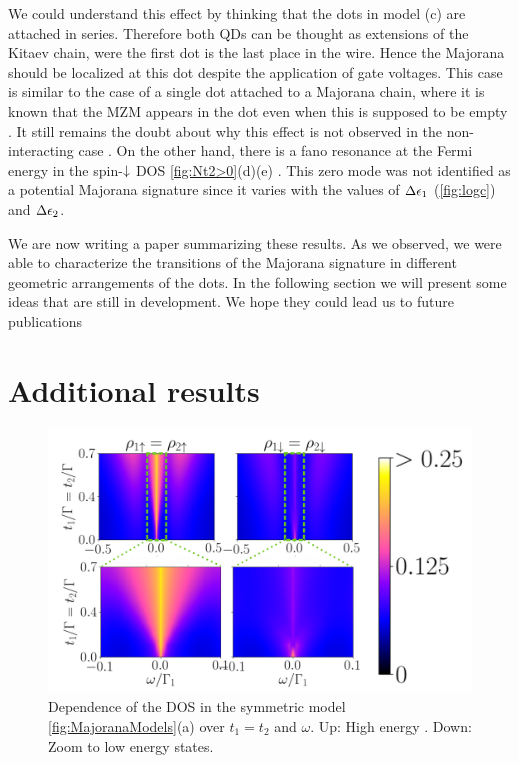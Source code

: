     We could understand this effect by thinking that the dots in model (c) are attached in series. Therefore both QDs can be thought as extensions of the Kitaev chain, were the first dot is the last place in the wire. Hence the Majorana should be localized at this dot despite the application of gate voltages. This case is similar to the case of a single dot attached to a Majorana chain, where it is known that the MZM appears in the dot even when this is supposed to be empty \cite{vernek_subtle_2014}. It still remains the doubt about why this effect is not observed in the non-interacting case . On the other hand, there is a fano resonance at the Fermi energy in the spin-$\downarrow$ DOS  \ref{fig:Nt2>0}(d)(e) . This zero mode was not identified as a potential Majorana signature since it varies with the values of $\Delta \epsilon_1$ (\ref{fig:logc}) and $\Delta \epsilon_2$.
    

We are now writing a paper summarizing these results. As we observed, we were able to characterize the transitions of the Majorana signature in different geometric arrangements of the dots. In the following section we will present some ideas that are still in development. We hope they could lead us to future publications

\section{Additional  results}

\begin{figure}[t]
\centering
\includegraphics[scale=0.45]{IMAGES/NRG/Indirect.png}
\caption{\label{fig:indirect} Dependence of the DOS in the symmetric model \ref{fig:MajoranaModels}(a) over $t_1=t_2$ and $\omega$. Up: High energy . Down: Zoom to low energy states.  \protect{}}
\end{figure}

